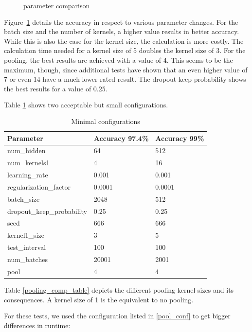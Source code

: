 \documentclass{article}
\begin{document}
\begin{enumerate}
\begin{item}
\begin{figure}
			\caption{parameter comparison}
			\label{fig:parameters}
		\end{figure}
		Figure~\ref{fig:parameters} details the accuracy in respect to various parameter changes. For the batch size and the number of kernels, a higher value results in better accuracy. While this is also the case for the kernel size, the calculation is more costly. The calculation time needed for a kernel size of 5 doubles the kernel size of 3. For the pooling, the best results are achieved with a value of 4. This seems to be the maximum, though, since additional tests have shown that an even higher value of 7 or even 14 have a much lower rated result.
		The dropout keep probability shows the best results for a value of 0.25. 
		
	\end{item}
	\begin{item}
		Table \ref{smallest_conf} shows two acceptable but small configurations.
		\begin{table}[h]
			\caption{Minimal configurations}
			\label{smallest_conf}
			\centering
			\begin{tabular}{lll}
				\toprule
				Parameter     & Accuracy 97.4\%     & Accuracy 99\% \\
				\midrule
				num\_hidden & 64 & 512 \\
				num\_kernels1 & 4 & 16 \\
				learning\_rate & 0.001 & 0.001 \\
				regularization\_factor & 0.0001 & 0.0001 \\
				batch\_size & 2048 & 512 \\
				dropout\_keep\_probability & 0.25 & 0.25 \\
				seed & 666 & 666 \\
				kernel1\_size & 3 & 5 \\
				test\_interval & 100 & 100 \\
				num\_batches & 20001 & 2001 \\
				pool & 4 & 4 \\
				
				
				\bottomrule
			\end{tabular}
		\end{table}
	\end{item}
	\begin{item}
		Table \ref{pooling_comp_table} depicts the different pooling kernel sizes and its consequences. A kernel size of 1 is the equivalent to no pooling.
		
		For these tests, we used the configuration listed in \ref{pool_conf} to get bigger differences in runtime:
		

\end{item}
\end{enumerate}
\end{document}
